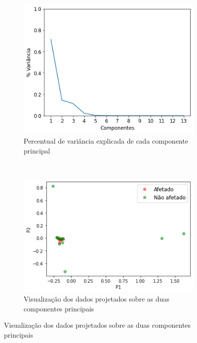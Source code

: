 \begin{figure}[htb] 
    \centering 
    \caption{PCA sobre dados mensais de seções}
    \label{fig:resultados:base-de-dados-26-pca-components-monthly-secao} 
    \begin{subfigure}[b]{0.45\textwidth}
        \includegraphics[scale=0.45]{images/base-de-dados-26.1-pca-components-monthly-secao.png}
        \caption{Percentual de variância explicada de cada componente principal}
        \label{fig:resultados:26.1-pca-components-monthly-seca}
    \end{subfigure} ~ \quad
    \begin{subfigure}[b]{0.45\textwidth}
        \includegraphics[scale=0.45]{images/base-de-dados-26.2-pca-2d-monthly-secao.png}
        \caption{Visualização dos dados projetados sobre as duas componentes principais}
        \label{fig:resultados:base-de-dados-26.2-pca-2d-monthly-secao}
    \end{subfigure}
    \fdadospesquisa
\end{figure}

